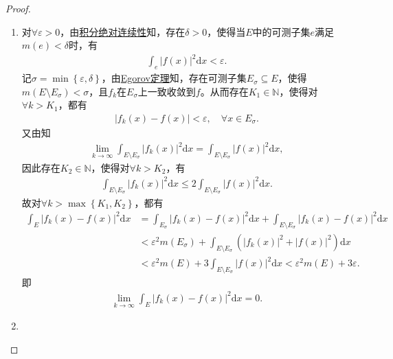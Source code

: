 \documentclass[../../main.tex]{subfiles}%
\begin{document}
\begin{proof}
\begin{enumerate}[(1)]
\item 对$\forall \varepsilon >0$，由\hyperref[theorem:积分的绝对连续性]{积分绝对连续性}知，存在$\delta >0$，使得当$E$中的可测子集$e$满足$m\left( e \right) <\delta $时，有
\begin{align*}
\int_e\left| f\left( x \right) \right|^2\mathrm{d}x<\varepsilon.
\end{align*}
记$\sigma =\min \left\{ \varepsilon ,\delta \right\}$，由\hyperref[theorem:Egorov定理]{Egorov定理}知，存在可测子集$E_{\sigma}\subseteq E$，使得$m\left( E\setminus E_{\sigma} \right) <\sigma $，且$f_k$在$E_{\sigma}$上一致收敛到$f$。从而存在$K_1\in \mathbb{N} $，使得对$\forall k>K_1$，都有
\begin{align*}
\left| f_k\left( x \right) -f\left( x \right) \right|<\varepsilon ,\quad \forall x\in E_{\sigma}.
\end{align*}
又由知
\begin{align*}
\lim\limits_{k\rightarrow \infty}\int_{E\setminus E_{\sigma}}\left| f_k\left( x \right) \right|^2\mathrm{d}x=\int_{E\setminus E_{\sigma}}\left| f\left( x \right) \right|^2\mathrm{d}x,
\end{align*}
因此存在$K_2\in \mathbb{N} $，使得对$\forall k>K_2$，有
\begin{align*}
\int_{E\setminus E_{\sigma}}\left| f_k\left( x \right) \right|^2\mathrm{d}x\leqslant 2\int_{E\setminus E_{\sigma}}\left| f\left( x \right) \right|^2\mathrm{d}x.
\end{align*}
故对$\forall k>\max \left\{ K_1,K_2 \right\}$，都有
\begin{align*}
\int_E\left| f_k\left( x \right) -f\left( x \right) \right|^2\mathrm{d}x&=\int_{E_{\sigma}}\left| f_k\left( x \right) -f\left( x \right) \right|^2\mathrm{d}x+\int_{E\setminus E_{\sigma}}\left| f_k\left( x \right) -f\left( x \right) \right|^2\mathrm{d}x\\
&<\varepsilon^2 m\left( E_{\sigma} \right) +\int_{E\setminus E_{\sigma}}\left( \left| f_k\left( x \right) \right|^2+\left| f\left( x \right) \right|^2 \right) \mathrm{d}x\\
&<\varepsilon^2 m\left( E \right) +3\int_{E\setminus E_{\sigma}}\left| f\left( x \right) \right|^2\mathrm{d}x<\varepsilon^2 m\left( E \right) +3\varepsilon.
\end{align*}
即
\begin{align*}
\lim\limits_{k\rightarrow \infty}\int_E\left| f_k\left( x \right) -f\left( x \right) \right|^2\mathrm{d}x=0.
\end{align*}

\item 
\end{enumerate}
\end{proof}
\end{document}
